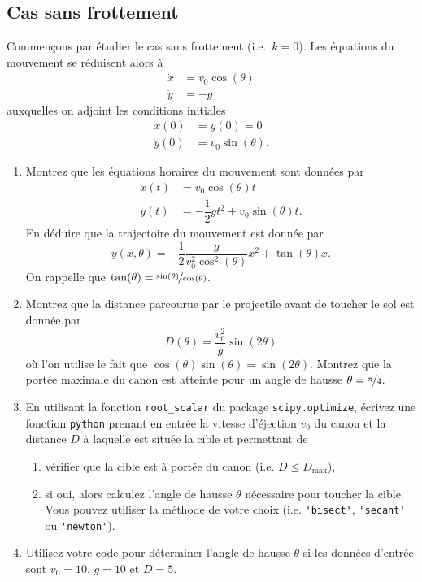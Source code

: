 \documentclass[a4paper,12pt]{article} %
\begin{document}
\subsection*{Cas sans frottement}

Commençons par étudier le cas sans frottement (i.e.\ $k = 0$).
Les équations du mouvement se réduisent alors à
%
\[
\begin{aligned}
  \dot{x} & = v_0 \cos(\theta) \\
  \ddot{y} & = -g
\end{aligned}
\]
%
auxquelles on adjoint les conditions initiales
%
\[
\begin{aligned}
  x(0) & = y(0) = 0 \\
  \dot{y}(0) & = v_0 \sin(\theta).
\end{aligned}
\]

\begin{enumerate}
\item Montrez que les équations horaires du mouvement sont données par
  \[
  \begin{aligned}
    x(t) & = v_0 \cos(\theta) t \\
    y(t) & = -\dfrac{1}{2} gt^2 + v_0\sin(\theta) t.
  \end{aligned}
  \]
  En déduire que la trajectoire du mouvement est donnée par
  \[
  y(x, \theta) = -\dfrac{1}{2} \dfrac{g}{v_0^2 \cos^2(\theta)} x^2 + \tan(\theta) x.
  \]
  On rappelle que $\tan(\theta) = \nicefrac{\sin(\theta)}{\cos(\theta)}$.

\item Montrez que la distance parcourue par le projectile avant de toucher le sol est donnée par
  \[
  D(\theta) = \dfrac{v_0^2}{g} \sin(2\theta)
  \]
  où l'on utilise le fait que $\cos(\theta) \sin(\theta) = \sin(2\theta)$.
  Montrez que la portée maximale du canon est atteinte pour un angle de hausse $\theta = \nicefrac{\pi}{4}$.

\item En utilisant la fonction \verb+root_scalar+ du package \verb+scipy.optimize+, écrivez une fonction \verb+python+ prenant en entrée la vitesse d'éjection $v_0$ du canon et la distance $D$ à laquelle est située la cible et permettant de
  \begin{enumerate}
  \item vérifier que la cible est à portée du canon (i.e. $D \leq D_{\max}$),
  \item si oui, alors calculez l'angle de hausse $\theta$ nécessaire pour toucher la cible.
    Vous pouvez utiliser la méthode de votre choix (i.e. \verb+'bisect'+, \verb+'secant'+ ou \verb+'newton'+).
  \end{enumerate}

\item Utilisez votre code pour déterminer l'angle de hausse $\theta$ si les données d'entrée sont $v_0 = 10$, $g=10$ et $D = 5$.
\end{enumerate}
\end{document}
